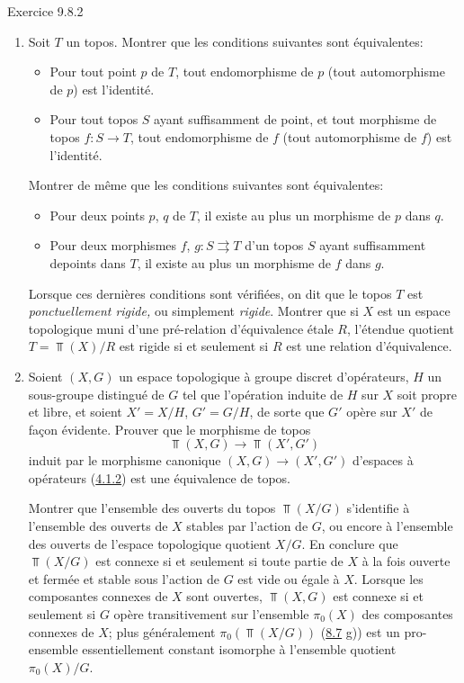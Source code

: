 \documentclass[10pt]{../fichiers-configuration-latex/smfart}
\begin{document}
\begin{enonce*}[remark]{Exercice 9.8.2}
\begin{enumerate}
\item Soit $T$ un topos. Montrer que les conditions suivantes sont
équivalentes:
\begin{itemize}
\item[i)] Pour tout point $p$ de $T$, tout endomorphisme de $p$
(\resp tout automorphisme de $p$) est l'identité.

\item[ii)] Pour tout topos $S$ ayant suffisamment de point, et tout
morphisme de topos $f:S\rightarrow T$, tout endomorphisme de $f$
(\resp tout automorphisme de $f$) est l'identité.
\end{itemize}
Montrer de même que les conditions suivantes sont équivalentes:
\begin{itemize}
\item[${\rm i')}$] Pour deux points $p$, $q$ de $T$, il existe au
plus un morphisme de $p$ dans $q$.

\item[${\rm ii')}$] Pour deux morphismes $f$, $g:S\rightrightarrows
T$ d'un topos $S$ ayant suffisamment de\pageoriginale points dans
$T$, il existe au plus un morphisme de $f$ dans $g$.
\end{itemize}

Lorsque ces dernières conditions sont vérifiées, on dit que le topos
$T$ est \emph{ponctuellement rigide,} ou simplement \emph{rigide}.
Montrer que si $X$ est un espace topologique muni d'une pré-relation
d'équivalence étale $R$, l'étendue quotient $T=\Top(X)/R$ est rigide
si et seulement si $R$ est une relation d'équivalence.

\item Soient $(X,G)$ un espace topologique à groupe discret d'opérateurs,
$H$ un sous-groupe distingué de $G$ tel que l'opération induite de
$H$ sur $X$ soit propre et libre, et soient $X'=X/H$, $G'=G/H$, de
sorte que $G'$ opère sur $X'$ de façon évidente. Prouver que le
morphisme de topos
$$
\Top(X,G)\longrightarrow \Top(X',G')
$$
induit par le morphisme canonique $(X,G)\rightarrow (X',G')$
d'espaces à opérateurs (\hyperref[IV.subsubsec4.1.2]{4.1.2}) est une équivalence
de topos.

Montrer que l'ensemble des ouverts du topos $\Top(X/G)$ s'identifie
à l'ensemble des ouverts de $X$ stables par l'action de $G$, ou
encore à l'ensemble des ouverts de l'espace topologique quotient
$X/G$. En conclure que $\Top(X/G)$ est connexe si et seulement si
toute partie de $X$ à la fois ouverte et fermée et stable sous
l'action de $G$ est vide ou égale à $X$. Lorsque les composantes
connexes de $X$ sont ouvertes, $\Top(X,G)$ est connexe si et
seulement si $G$ opère transitivement sur l'ensemble $\pi_0(X)$ des
composantes connexes de $X$; plus généralement $\pi_0(\Top(X/G))$
(\hyperref[IV.exer8.7]{8.7} g)) est un pro-ensemble essentiellement constant
isomorphe à l'ensemble quotient $\pi_0(X)/G$.


\end{enumerate}
\end{enonce*}
\end{document}
